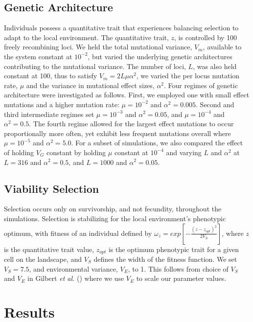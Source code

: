  
\subsection{Genetic Architecture}
Individuals possess a quantitative trait that experiences balancing selection to adapt to the local environment. The quantitative trait, $z$, is controlled by 100 freely recombining loci. We held the total mutational variance, $V_m$, available to the system constant at $10^{-2}$, but varied the underlying genetic architectures contributing to the mutational variance. The number of loci, $L$, was also held constant at 100, thus to satisfy $V_m = 2 L \mu \alpha^2$, we varied the per locus mutation rate, $\mu$ and the variance in mutational effect sizes, $\alpha^2$. Four regimes of genetic architecture were investigated as follows. First, we employed one with small effect mutations and a higher mutation rate: $\mu = 10^{-2}$ and $\alpha^2 = 0.005$. Second and third intermediate regimes set $\mu = 10^{-3}$ and $\alpha^2 = 0.05$, and $\mu = 10^{-4}$ and $\alpha^2 = 0.5$. The fourth regime allowed for the largest effect mutations to occur proportionally more often, yet exhibit less frequent mutations overall where $\mu = 10^{-5}$ and $\alpha^2 = 5.0$. \color{red}For a subset of simulations, we also compared the effect of holding $V_G$ constant by holding $\mu$ constant at $10^{-4}$ and varying $L$ and $\alpha^2$ at $L = 316$ and $\alpha^2 = 0.5$, and $L = 1000$ and $\alpha^2 = 0.05$.\color{black}


\subsection{Viability Selection}
Selection occurs only on survivorship, and not fecundity, throughout the simulations. Selection is stabilizing for the local environment's phenotypic optimum, with fitness of an individual defined by $\omega_z = exp[-\frac{(z-z_{opt})^2}{2V_S}]$, where $z$ is the quantitative trait value, $z_{opt}$ is the optimum phenotypic trait for a given cell on the landscape, and $V_S$ defines the width of the fitness function. We set $V_S = 7.5$, and environmental variance, $V_E$, to 1. This follows from choice of $V_S$ and $V_E$ in Gilbert \emph{et al.} () where we use $V_E$ to scale our parameter values.%
 
 

\section{Results}

